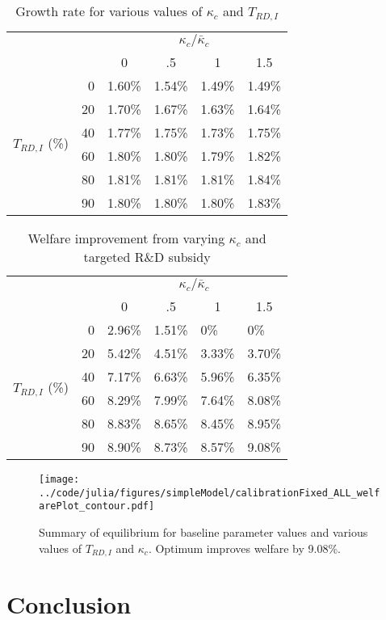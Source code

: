 \documentclass[11pt,english]{article}
\theoremstyle{definition}
\begin{document}
\begin{table}
	\centering
	\caption{Growth rate for various values of $\kappa_c$ and $T_{RD,I}$}\label{allpolicies_table_growth}
	\begin{tabular}{lrllll}
		\toprule \toprule
		&  & \multicolumn{4}{c}{$\kappa_c / \bar{\kappa}_c$} \vspace{3pt} \tabularnewline
		& & \multicolumn{1}{c}{0} & \multicolumn{1}{c}{.5} & \multicolumn{1}{c}{1} & \multicolumn{1}{c}{1.5}\tabularnewline
		\midrule
		\multirow{6}{*}{$T_{RD,I}$ (\%)} & 0 & 1.60\% & 1.54\% & 1.49\% & 1.49\% \tabularnewline
		& 20 & 1.70\% & 1.67\% & 1.63\% & 1.64\% \tabularnewline
		& 40 & 1.77\% & 1.75\% & 1.73\% & 1.75\% \tabularnewline
		& 60 & 1.80\% & 1.80\% & 1.79\% & 1.82\% \tabularnewline 
		& 80 & 1.81\% & 1.81\% & 1.81\% & 1.84\% \tabularnewline 
		& 90 & 1.80\% & 1.80\% & 1.80\% & 1.83\% \tabularnewline 
		\bottomrule
	\end{tabular}
\end{table}

\begin{table}
	\centering
	\caption{Welfare improvement from varying $\kappa_c$ and targeted R\&D subsidy}\label{allpolicies_table_welfare}
	\begin{tabular}{lrllll}
		\toprule \toprule
		&  & \multicolumn{4}{c}{$\kappa_c / \bar{\kappa}_c$} \vspace{3pt} \tabularnewline
		 & & \multicolumn{1}{c}{0} & \multicolumn{1}{c}{.5} & \multicolumn{1}{c}{1} & \multicolumn{1}{c}{1.5}\tabularnewline
		\midrule
		\multirow{6}{*}{$T_{RD,I}$ (\%)} & 0 & 2.96\% & 1.51\% & 0\% & 0\% \tabularnewline
		 & 20 & 5.42\% & 4.51\% & 3.33\% & 3.70\% \tabularnewline
		& 40 & 7.17\% & 6.63\% & 5.96\% & 6.35\% \tabularnewline
		& 60 & 8.29\% & 7.99\% & 7.64\% & 8.08\% \tabularnewline 
		& 80 & 8.83\% & 8.65\% & 8.45\% & 8.95\% \tabularnewline 
		& 90 & 8.90\% & 8.73\% & 8.57\% & 9.08\% \tabularnewline 
		\bottomrule
	\end{tabular}
\end{table}

\begin{figure}[]
	\centering
	\texttt{[image: ../code/julia/figures/simpleModel/calibrationFixed\_ALL\_welfarePlot\_contour.pdf]}
	\caption{Summary of equilibrium for baseline parameter values and various values of $T_{RD,I}$ and $\kappa_c$. Optimum improves welfare by 9.08\%.}
	\label{calibration_ALL_welfarePlot}
\end{figure}


\section{Conclusion}\label{sec:conclusion}
 
\end{document}
